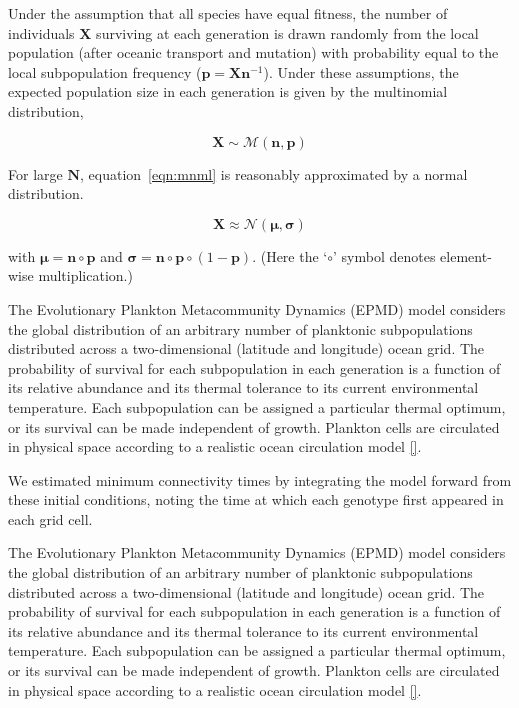 \documentclass[12pt]{article}
\begin{document}
Under the assumption that all species have equal fitness, the number of individuals $\mathbf{X}$ surviving at each generation is drawn randomly from the local population (after oceanic transport and mutation) with probability equal to the local subpopulation frequency ($\mathbf{p} = \mathbf{X} \mathbf{n}^{-1}$). Under these assumptions, the expected population size in each generation is given by the multinomial distribution, 

\begin{equation}
\label{eqn:mnml}
\mathbf{X}\sim\mathcal{M}(\mathbf{n},\mathbf{p})
\end{equation}

For large $\mathbf{N}$, equation~\ref{eqn:mnml} is reasonably approximated by a normal distribution.

\begin{equation}
\mathbf{X}\approx\mathcal{N}(\boldsymbol{\mu},\boldsymbol{\sigma})
\end{equation}

with $\boldsymbol{\mu}=\mathbf{n}\circ\mathbf{p}$ and $\boldsymbol{\sigma}=\mathbf{n}\circ\mathbf{p}\circ(1-\mathbf{p})$. (Here the `$\circ$' symbol denotes element-wise multiplication.)




The Evolutionary Plankton Metacommunity Dynamics (EPMD) model considers the global distribution of an arbitrary number of planktonic subpopulations distributed across a two-dimensional (latitude and longitude) ocean grid. The probability of survival for each subpopulation in each generation is a function of its relative abundance and its thermal tolerance to its current environmental temperature. Each subpopulation can be assigned a particular thermal optimum, or its survival can be made independent of growth. Plankton cells are circulated in physical space according to a realistic ocean circulation model \ref{}. 



We estimated minimum connectivity times by integrating the model forward from these initial conditions, noting the time at which each genotype first appeared in each grid cell. 

The Evolutionary Plankton Metacommunity Dynamics (EPMD) model considers the global distribution of an arbitrary number of  planktonic subpopulations distributed across a two-dimensional (latitude and longitude) ocean grid. The probability of survival for each subpopulation in each generation is a function of its relative abundance and its thermal tolerance to its current environmental temperature. Each subpopulation can be assigned a particular thermal optimum, or its survival can be made independent of growth. Plankton cells are circulated in physical space according to a realistic ocean circulation model \ref{}. 
\end{document}
